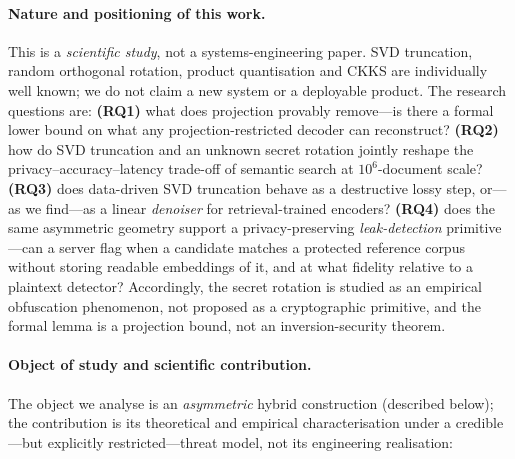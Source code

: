 \documentclass[11pt,a4paper]{article}
\begin{document}
\paragraph{Nature and positioning of this work.} This is a
\emph{scientific study}, not a systems-engineering paper. SVD truncation,
random orthogonal rotation, product quantisation and CKKS are
individually well known; we do not claim a new system or a deployable
product. The research questions are: \textbf{(RQ1)} what does projection
provably remove---is there a formal lower bound on what any
projection-restricted decoder can reconstruct? \textbf{(RQ2)} how do SVD
truncation and an unknown secret rotation jointly reshape the
privacy--accuracy--latency trade-off of semantic search at
$10^6$-document scale? \textbf{(RQ3)} does data-driven SVD truncation
behave as a destructive lossy step, or---as we find---as a linear
\emph{denoiser} for retrieval-trained encoders? \textbf{(RQ4)} does the same
asymmetric geometry support a privacy-preserving \emph{leak-detection}
primitive---can a server flag when a candidate matches a protected
reference corpus without storing readable embeddings of it, and at what
fidelity relative to a plaintext detector? Accordingly, the secret
rotation is studied as an empirical obfuscation phenomenon, not proposed
as a cryptographic primitive, and the formal lemma is a projection
bound, not an inversion-security theorem.

\paragraph{Object of study and scientific contribution.} The object we
analyse is an \emph{asymmetric} hybrid construction (described below);
the contribution is its theoretical and empirical characterisation under
a credible---but explicitly restricted---threat model, not its
engineering realisation:
\end{document}
